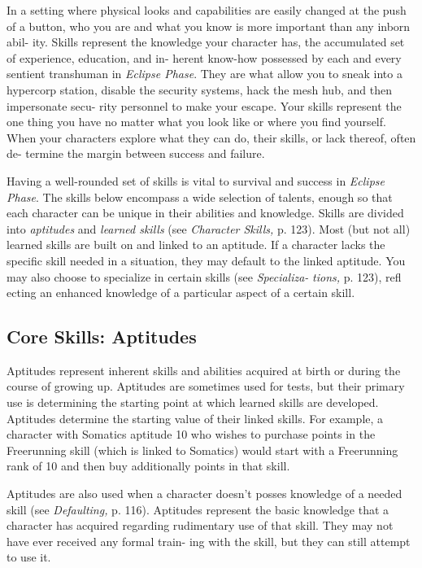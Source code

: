 In a setting where physical looks and capabilities are 
easily changed at the push of a button, who you are and 
what you know is more important than any inborn abil-
ity. Skills represent the knowledge your character has, 
the accumulated set of experience, education, and in-
herent know-how possessed by each and every sentient 
transhuman in \textit{Eclipse Phase}. They are what allow you 
to sneak into a hypercorp station, disable the security 
systems, hack the mesh hub, and then impersonate secu-
rity personnel to make your escape. Your skills represent 
the one thing you have no matter what you look like or 
where you find yourself. When your characters explore 
what they can do, their skills, or lack thereof, often de-
termine the margin between success and failure.

Having a well-rounded set of skills is vital to survival 
and success in \textit{Eclipse Phase}. The skills below encompass 
a wide selection of talents, enough so that each character 
can be unique in their abilities and knowledge.
Skills are divided into \textit{aptitudes} and \textit{learned skills }(see 
\textit{Character Skills,} p. 123). Most (but not all) learned 
skills are built on and linked to an aptitude. If a 
character lacks the specific skill needed in a situation, 
they may default to the linked aptitude. You may also 
choose to specialize in certain skills (see \textit{Specializa-}
\textit{tions,} p. 123), refl ecting an enhanced knowledge of a 
particular aspect of a certain skill.

\subsection{Core Skills: Aptitudes}

Aptitudes represent inherent skills and abilities acquired 
at birth or during the course of growing up. Aptitudes 
are sometimes used for tests, but their primary use is 
determining the starting point at which learned skills 
are developed. Aptitudes determine the starting value 
of their linked skills. For example, a character with 
Somatics aptitude 10 who wishes to purchase points 
in the Freerunning skill (which is linked to Somatics) 
would start with a Freerunning rank of 10 and then 
buy additionally points in that skill.

Aptitudes are also used when a character doesn't 
posses knowledge of a needed skill (see \textit{Defaulting,} p. 
116). Aptitudes represent the basic knowledge that a 
character has acquired regarding rudimentary use of that 
skill. They may not have ever received any formal train-
ing with the skill, but they can still attempt to use it.


